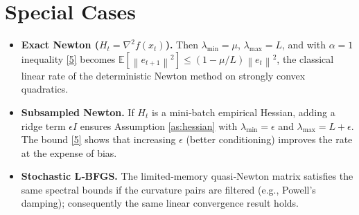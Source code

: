 \documentclass{article}
\newcommand{\E}{\mathbb{E}}
\newcommand{\norm}[1]{\left\|#1\right\|}
\begin{document}
\section*{Special Cases}
\begin{itemize}
\item \textbf{Exact Newton ($H_t=\nabla^{2}f(x_t)$).}
  Then $\lambda_{\min}=\mu$, $\lambda_{\max}=L$, and with $\alpha=1$
  inequality \eqref{5} becomes
  $\E[\norm{e_{t+1}}^{2}]\le(1-\mu/L)\norm{e_t}^{2}$,
  the classical linear rate of the deterministic Newton method on
  strongly convex quadratics.
\item \textbf{Subsampled Newton.}
  If $H_t$ is a mini‑batch empirical Hessian, adding a ridge term
  $\epsilon I$ ensures Assumption \ref{as:hessian} with
  $\lambda_{\min}=\epsilon$ and $\lambda_{\max}=L+\epsilon$.
  The bound \eqref{5} shows that increasing $\epsilon$ (better
  conditioning) improves the rate at the expense of bias.
\item \textbf{Stochastic L‑BFGS.}
  The limited‑memory quasi‑Newton matrix satisfies the same spectral
  bounds if the curvature pairs are filtered (e.g., Powell’s damping);
  consequently the same linear convergence result holds.
\end{itemize}
\end{document}
